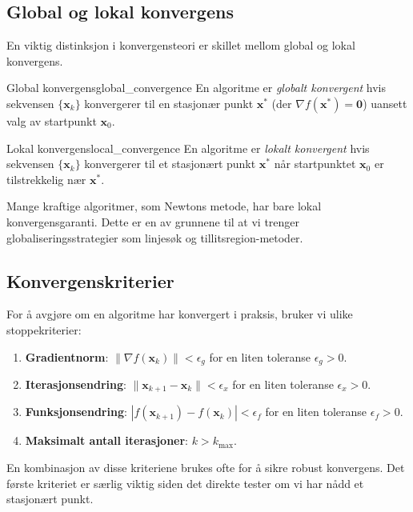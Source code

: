\subsection{Global og lokal konvergens}

En viktig distinksjon i konvergensteori er skillet mellom global og lokal konvergens.

\begin{definition}{Global konvergens}{global_convergence}
	En algoritme er \emph{globalt konvergent} hvis sekvensen \(\{\symbf{x}_k\}\) konvergerer til en stasjonær punkt \(\symbf{x}^\ast\) (der \(\nabla f(\symbf{x}^\ast) = \symbf{0}\)) uansett valg av startpunkt \(\symbf{x}_0\).
\end{definition}

\begin{definition}{Lokal konvergens}{local_convergence}
	En algoritme er \emph{lokalt konvergent} hvis sekvensen \(\{\symbf{x}_k\}\) konvergerer til et stasjonært punkt \(\symbf{x}^\ast\) når startpunktet \(\symbf{x}_0\) er tilstrekkelig nær \(\symbf{x}^\ast\).
\end{definition}

Mange kraftige algoritmer, som Newtons metode, har bare lokal konvergensgaranti. Dette er en av grunnene til at vi trenger globaliseringsstrategier som linjesøk og tillitsregion-metoder.

\subsection{Konvergenskriterier}

For å avgjøre om en algoritme har konvergert i praksis, bruker vi ulike stoppekriterier:

\begin{enumerate}
	\item \textbf{Gradientnorm}: \(\|\nabla f(\symbf{x}_k)\| < \epsilon_g\) for en liten toleranse \(\epsilon_g > 0\).
	\item \textbf{Iterasjonsendring}: \(\|\symbf{x}_{k+1} - \symbf{x}_k\| < \epsilon_x\) for en liten toleranse \(\epsilon_x > 0\).
	\item \textbf{Funksjonsendring}: \(|f(\symbf{x}_{k+1}) - f(\symbf{x}_k)| < \epsilon_f\) for en liten toleranse \(\epsilon_f > 0\).
	\item \textbf{Maksimalt antall iterasjoner}: \(k > k_{\max}\).
\end{enumerate}

En kombinasjon av disse kriteriene brukes ofte for å sikre robust konvergens. Det første kriteriet er særlig viktig siden det direkte tester om vi har nådd et stasjonært punkt.

